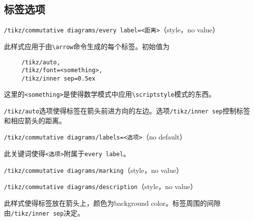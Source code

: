 \documentclass{ctexart}
\begin{document}
\subsection{标签选项}
\par {\color{red}\texttt{/tikz/commutative diagrams/every label=<距离>}}\hfill （style，no value）
\par 此样式应用于由\verb|\arrow|命令生成的每个标签。初始值为
\begin{lstlisting}
     /tikz/auto,
     /tikz/font=<something>,
     /tikz/inner sep=0.5ex
\end{lstlisting}
这里的\verb|<something>|是使得数学模式中应用\verb|\scriptstyle|模式的东西。
\par \verb|/tikz/auto|选项使得标签在箭头前进方向的左边。选项\verb|/tikz/inner sep|控制标签和相应箭头的距离。
\par{\color{red}\texttt{/tikz/commutative diagrams/labels=<选项>}}\hfill （no default）
\par 此关键词使得\verb|<选项>|附属于\verb|every label|。
\par{\color{red}\texttt{/tikz/commutative diagrams/marking}}\hfill （style，no value）
\par {\color{red}\texttt{/tikz/commutative diagrams/description}}\hfill （style，no value）
\par 此样式使得标签放在箭头上，颜色为background color。标签周围的间隙由\verb|/tikz/inner sep|决定。
\begin{tcblisting}{}
\end{tcblisting}
\end{document}
